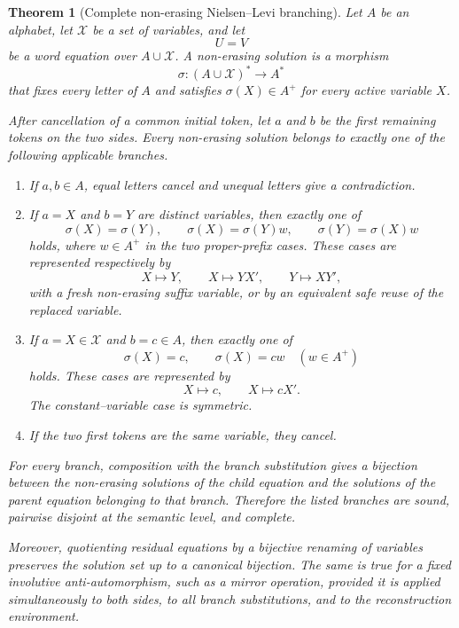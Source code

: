 \documentclass[11pt]{article}
\newtheorem{theorem}{Theorem}[section]
\begin{document}
\begin{theorem}[Complete non-erasing Nielsen--Levi branching]\label{thm:nielsen}
Let $A$ be an alphabet, let $\mathcal X$ be a set of variables, and let
\[
  U=V
\]
be a word equation over $A\cup\mathcal X$. A non-erasing solution is a morphism
\[
  \sigma:(A\cup\mathcal X)^*\to A^*
\]
that fixes every letter of $A$ and satisfies $\sigma(X)\in A^+$ for every active variable $X$.

After cancellation of a common initial token, let $a$ and $b$ be the first remaining tokens on the two sides. Every non-erasing solution belongs to exactly one of the following applicable branches.

\begin{enumerate}[label=\textnormal{(\alph*)}]
\item If $a,b\in A$, equal letters cancel and unequal letters give a contradiction.
\item If $a=X$ and $b=Y$ are distinct variables, then exactly one of
\[
  \sigma(X)=\sigma(Y),\qquad
  \sigma(X)=\sigma(Y)w,\qquad
  \sigma(Y)=\sigma(X)w
\]
holds, where $w\in A^+$ in the two proper-prefix cases. These cases are represented respectively by
\[
  X\mapsto Y,\qquad X\mapsto YX',\qquad Y\mapsto XY',
\]
with a fresh non-erasing suffix variable, or by an equivalent safe reuse of the replaced variable.
\item If $a=X\in\mathcal X$ and $b=c\in A$, then exactly one of
\[
  \sigma(X)=c,\qquad \sigma(X)=cw\quad(w\in A^+)
\]
holds. These cases are represented by
\[
  X\mapsto c,
  \qquad X\mapsto cX'.
\]
The constant--variable case is symmetric.
\item If the two first tokens are the same variable, they cancel.
\end{enumerate}

For every branch, composition with the branch substitution gives a bijection between the non-erasing solutions of the child equation and the solutions of the parent equation belonging to that branch. Therefore the listed branches are sound, pairwise disjoint at the semantic level, and complete.

Moreover, quotienting residual equations by a bijective renaming of variables preserves the solution set up to a canonical bijection. The same is true for a fixed involutive anti-automorphism, such as a mirror operation, provided it is applied simultaneously to both sides, to all branch substitutions, and to the reconstruction environment.
\end{theorem}
\end{document}
